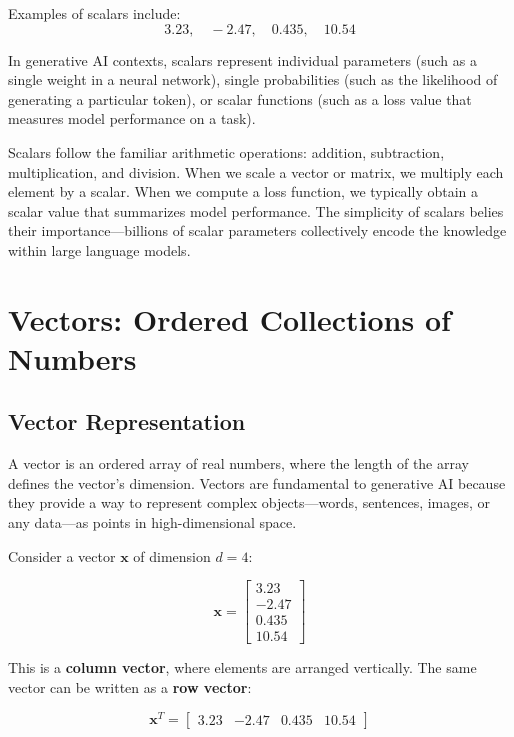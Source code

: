 \documentclass{book}
\begin{document}
Examples of scalars include:
\begin{equation}
3.23, \quad -2.47, \quad 0.435, \quad 10.54
\end{equation}

In generative AI contexts, scalars represent individual parameters (such as a single weight in a neural network), single probabilities (such as the likelihood of generating a particular token), or scalar functions (such as a loss value that measures model performance on a task).

Scalars follow the familiar arithmetic operations: addition, subtraction, multiplication, and division. When we scale a vector or matrix, we multiply each element by a scalar. When we compute a loss function, we typically obtain a scalar value that summarizes model performance. The simplicity of scalars belies their importance—billions of scalar parameters collectively encode the knowledge within large language models.

\section{Vectors: Ordered Collections of Numbers}

\subsection{Vector Representation}

A vector is an ordered array of real numbers, where the length of the array defines the vector's dimension. Vectors are fundamental to generative AI because they provide a way to represent complex objects—words, sentences, images, or any data—as points in high-dimensional space.

Consider a vector $\mathbf{x}$ of dimension $d = 4$:

\begin{equation}
\mathbf{x} = \begin{bmatrix}
3.23 \\
-2.47 \\
0.435 \\
10.54
\end{bmatrix}
\end{equation}

This is a \textbf{column vector}, where elements are arranged vertically. The same vector can be written as a \textbf{row vector}:

\begin{equation}
\mathbf{x}^T = \begin{bmatrix} 3.23 & -2.47 & 0.435 & 10.54 \end{bmatrix}
\end{equation}
\end{document}
